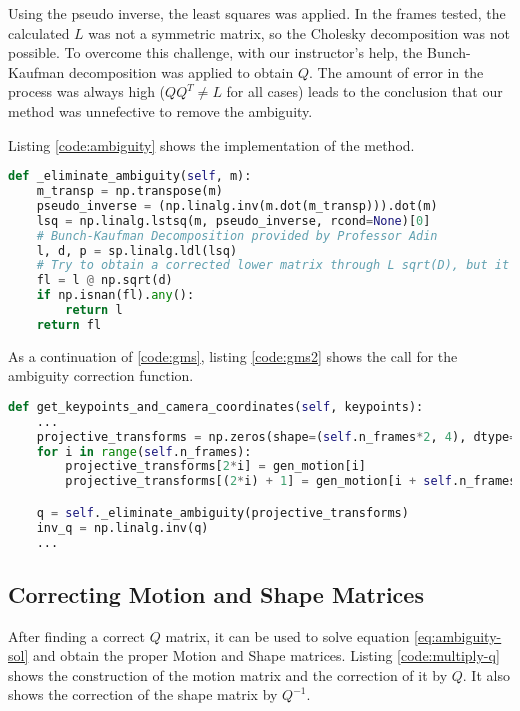 \documentclass[]{IEEEtran}
\begin{document}
Using the pseudo inverse, the least squares was applied. In the frames tested, the calculated $L$ was not a symmetric matrix, so the Cholesky decomposition was not possible. To overcome this challenge, with our instructor's help, the Bunch-Kaufman decomposition was applied to obtain $Q$. The amount of error in the process was always high ($QQ^{T} \neq L$ for all cases) leads to the conclusion that our method was unnefective to remove the ambiguity. 
\par Listing \ref{code:ambiguity} shows the implementation of the method.
\begin{lstlisting}[language=Python, caption={Ambiguity Solver.}, label={code:ambiguity}]
def _eliminate_ambiguity(self, m):
    m_transp = np.transpose(m)
    pseudo_inverse = (np.linalg.inv(m.dot(m_transp))).dot(m)
    lsq = np.linalg.lstsq(m, pseudo_inverse, rcond=None)[0]
    # Bunch-Kaufman Decomposition provided by Professor Adin
    l, d, p = sp.linalg.ldl(lsq)
    # Try to obtain a corrected lower matrix through L sqrt(D), but it won't work every time since D can be negative in the indefinite case
    fl = l @ np.sqrt(d)
    if np.isnan(fl).any():
        return l
    return fl
\end{lstlisting}

As a continuation of \ref{code:gms}, listing \ref{code:gms2} shows the call for the ambiguity correction function.

\begin{lstlisting}[language=Python, caption={Ambiguity Solver Call.}, label={code:gms2}]
def get_keypoints_and_camera_coordinates(self, keypoints):
    ...
    projective_transforms = np.zeros(shape=(self.n_frames*2, 4), dtype=np.float32)
    for i in range(self.n_frames):
        projective_transforms[2*i] = gen_motion[i]
        projective_transforms[(2*i) + 1] = gen_motion[i + self.n_frames]

    q = self._eliminate_ambiguity(projective_transforms)
    inv_q = np.linalg.inv(q)
    ...
\end{lstlisting}

\subsection{Correcting Motion and Shape Matrices}
After finding a correct $Q$ matrix, it can be used to solve equation \ref{eq:ambiguity-sol} and obtain the proper Motion and Shape matrices. Listing \ref{code:multiply-q} shows the construction of the motion matrix and the correction of it by $Q$. It also shows the correction of the shape matrix by $Q^{-1}$.
\end{document}
